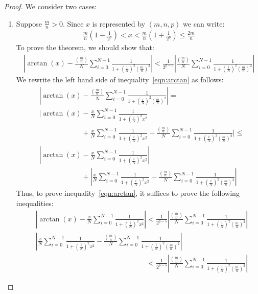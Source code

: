 \documentclass{article}
\numberwithin{mytheorem}{section}
\newcommand{\arctansumu}[2] {\frac{#1}{#2} \sum_{i=0}^{#2-1}\frac{1}{1+(\frac{i}{#2})^2{#1}^2}}
\begin{document}
\begin{proof}
We consider two cases:
\begin{enumerate}
\item
Suppose $\frac{m}{n}>0$. Since $x$ is represented by $(m,n,p)$ we can write:
\begin{align}
\frac{m}{n}(1-\frac{1}{2^p})<x<\frac{m}{n}(1+\frac{1}{2^p})\leq \frac{2m}{n}\label{eqn:arctan_x_bound}
\end{align}
To prove the theorem, we should show that:
\begin{align}
|\arctan(x)-\arctansumu{(\frac{m}{n})}{N}|<\frac{1}{2^{p-6}}|\arctansumu{(\frac{m}{n})}{N}|\label{eqn:arctan}
\end{align}
We rewrite the left hand side of inequality~\eqref{eqn:arctan} as follows:
\begin{align*}
&|\arctan(x)-\arctansumu{(\frac{m}{n})}{N}|=\\
&|\arctan(x)-\arctansumu{x}{N}\\
&\phantom{|\arctan(x)}+\arctansumu{x}{N}-\arctansumu{(\frac{m}{n})}{N}|\leq \\
&|\arctan(x)-\arctansumu{x}{N}|\\
&\phantom{|\arctan(x)}+|\arctansumu{x}{N}-\arctansumu{(\frac{m}{n})}{N}|
\end{align*}
Thus, to prove inequality~\eqref{eqn:arctan}, it suffices to prove the following inequalities:
\begin{align}
&|\arctan(x)-\arctansumu{x}{N}|<\frac{1}{2^{p-5}}|\arctansumu{(\frac{m}{n})}{N}|\label{eqn:arctan_part_1}\\
&|\arctansumu{x}{N}-\arctansumu{(\frac{m}{n})}{N}|\nonumber\\
&\phantom{|\arctan(x)-\arctansumu{x}{N}|}<\frac{1}{2^{p-5}}|\arctansumu{(\frac{m}{n})}{N}|\label{eqn:arctan_part_2}
\end{align}


\end{enumerate}
\end{proof}
\end{document}
